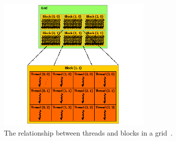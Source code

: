 \begin{figure}[ht!]
\centering
\includegraphics[width=75mm]{../gfx/blocks_and_threads.png}
\caption{The relationship between threads and blocks in a grid~\cite{cuda_programming_guide}.}
\label{fig:thread_block}
\end{figure}

\cleardoublepage
